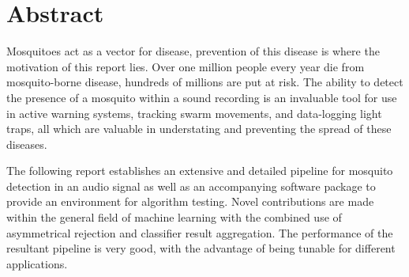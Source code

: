\section*{Abstract}


Mosquitoes act as a vector for disease, prevention of this disease is where the motivation of this report lies. Over one million people every year die from mosquito-borne disease, hundreds of millions are put at risk. The ability to detect the presence of a mosquito within a sound recording is an invaluable tool for use in active warning systems, tracking swarm movements, and data-logging light traps, all which are valuable in understating and preventing the spread of these diseases. 

The following report establishes an extensive and detailed pipeline for mosquito detection in an audio signal as well as an accompanying software package to provide an environment for algorithm testing. Novel contributions are made within the general field of machine learning with the combined use of asymmetrical rejection and classifier result aggregation. The performance of the resultant pipeline is very good, with the advantage of being tunable for different applications.












